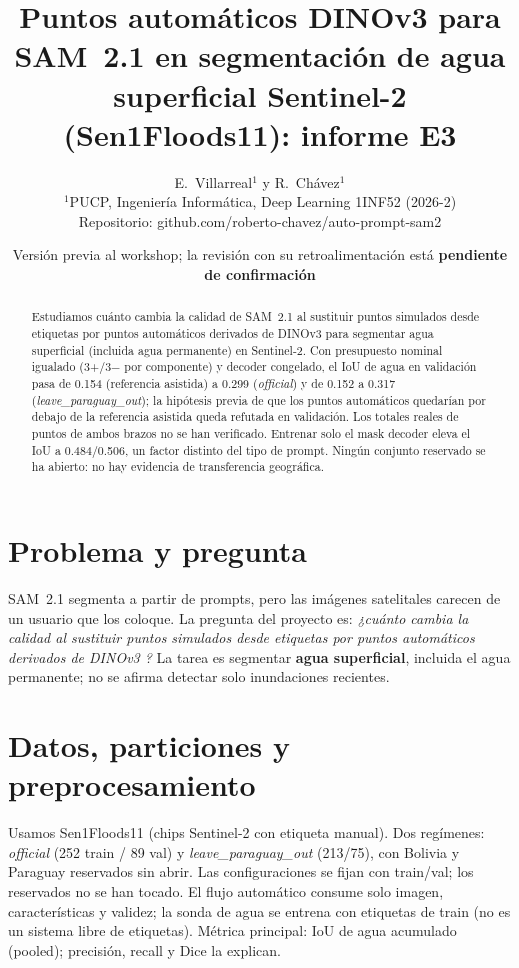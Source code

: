 \documentclass[11pt,twocolumn,a4paper]{article}
\title{\vspace{-1.2cm}\large\textbf{Puntos autom\'aticos DINOv3 para SAM~2.1 en segmentaci\'on de agua superficial Sentinel-2 (Sen1Floods11): informe E3}}
\author{\small E.~Villarreal$^{1}$ y R.~Ch\'avez$^{1}$ \\ \footnotesize $^{1}$PUCP, Ingenier\'ia Inform\'atica, Deep Learning 1INF52 (2026-2) \\ \footnotesize Repositorio: github.com/roberto-chavez/auto-prompt-sam2}
\date{\vspace{-0.6cm}\footnotesize Versi\'on previa al workshop; la revisi\'on con su retroalimentaci\'on est\'a \textbf{pendiente de confirmaci\'on}}
\begin{document}
\maketitle
\begin{abstract}\small
Estudiamos cu\'anto cambia la calidad de SAM~2.1 al sustituir puntos simulados desde etiquetas por puntos autom\'aticos derivados de DINOv3 para segmentar agua superficial (incluida agua permanente) en Sentinel-2. Con presupuesto nominal igualado (3+/3$-$ por componente) y decoder congelado, el IoU de agua en validaci\'on pasa de 0.154 (referencia asistida) a 0.299 (\emph{official}) y de 0.152 a 0.317 (\emph{leave\_paraguay\_out}); la hip\'otesis previa de que los puntos autom\'aticos quedar\'ian por debajo de la referencia asistida queda refutada en validaci\'on. Los totales reales de puntos de ambos brazos no se han verificado. Entrenar solo el mask decoder eleva el IoU a 0.484/0.506, un factor distinto del tipo de prompt. Ning\'un conjunto reservado se ha abierto: no hay evidencia de transferencia geogr\'afica.
\end{abstract}

\section{Problema y pregunta}
SAM~2.1 \cite{ravi2024sam2} segmenta a partir de prompts, pero las im\'agenes satelitales carecen de un usuario que los coloque. La pregunta del proyecto es: \emph{¿cu\'anto cambia la calidad al sustituir puntos simulados desde etiquetas por puntos autom\'aticos derivados de DINOv3 \cite{simeoni2025dinov3}?} La tarea es segmentar \textbf{agua superficial}, incluida el agua permanente; no se afirma detectar solo inundaciones recientes.

\section{Datos, particiones y preprocesamiento}
Usamos Sen1Floods11 \cite{bonafilia2020sen1floods11} (chips Sentinel-2 con etiqueta manual). Dos reg\'imenes: \emph{official} (252 train / 89 val) y \emph{leave\_paraguay\_out} (213/75), con Bolivia y Paraguay reservados sin abrir. Las configuraciones se fijan con train/val; los reservados no se han tocado. El flujo autom\'atico consume solo imagen, caracter\'isticas y validez; la sonda de agua se entrena con etiquetas de train (no es un sistema libre de etiquetas). M\'etrica principal: IoU de agua acumulado (pooled); precisi\'on, recall y Dice la explican.
\end{document}
